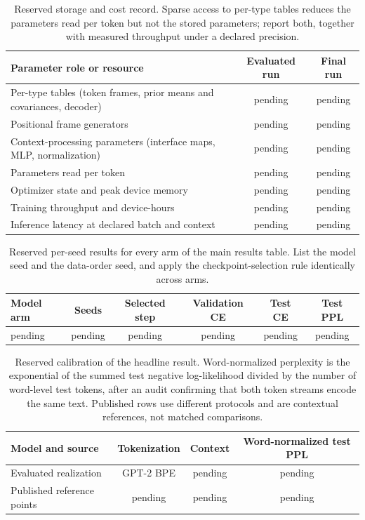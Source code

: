 \documentclass[twoside,11pt]{article}
\begin{document}
\begin{table}[htbp]
\centering
\small
\begin{tabularx}{\linewidth}{@{}>{\raggedright\arraybackslash}Xcc@{}}
\toprule
Parameter role or resource & Evaluated run & Final run \\
\midrule
Per-type tables (token frames, prior means and covariances, decoder) & pending & pending \\
Positional frame generators & pending & pending \\
Context-processing parameters (interface maps, MLP, normalization) & pending & pending \\
Parameters read per token & pending & pending \\
Optimizer state and peak device memory & pending & pending \\
Training throughput and device-hours & pending & pending \\
Inference latency at declared batch and context & pending & pending \\
\bottomrule
\end{tabularx}
\caption{Reserved storage and cost record. Sparse access to per-type tables reduces the parameters read per token but not the stored parameters; report both, together with measured throughput under a declared precision.}
\label{tab:placeholder_resources}
\end{table}

\begin{table}[htbp]
\centering
\small
\begin{tabular}{lccccc}
\toprule
Model arm & Seeds & Selected step & Validation CE & Test CE & Test PPL \\
\midrule
pending & pending & pending & pending & pending & pending \\
\bottomrule
\end{tabular}
\caption{Reserved per-seed results for every arm of the main results table. List the model seed and the data-order seed, and apply the checkpoint-selection rule identically across arms.}
\label{tab:placeholder_per_seed}
\end{table}

\begin{table}[htbp]
\centering
\small
\begin{tabular}{lccc}
\toprule
Model and source & Tokenization & Context & Word-normalized test PPL \\
\midrule
Evaluated realization & GPT-2 BPE & pending & pending \\
Published reference points & pending & pending & pending \\
\bottomrule
\end{tabular}
\caption{Reserved calibration of the headline result. Word-normalized perplexity is the exponential of the summed test negative log-likelihood divided by the number of word-level test tokens, after an audit confirming that both token streams encode the same text. Published rows use different protocols and are contextual references, not matched comparisons.}
\label{tab:placeholder_calibration}
\end{table}
\end{document}
